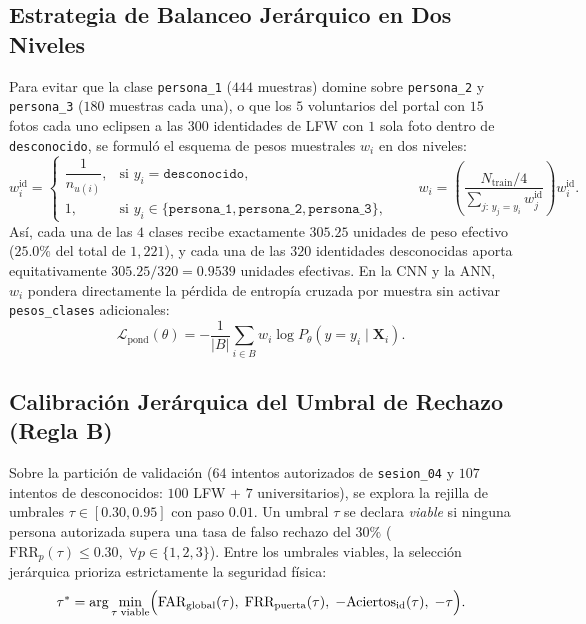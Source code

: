 \documentclass{article}
\begin{document}
\subsection{Estrategia de Balanceo Jerárquico en Dos Niveles}
Para evitar que la clase \texttt{persona\_1} ($444$ muestras) domine sobre \texttt{persona\_2} y \texttt{persona\_3} ($180$ muestras cada una), o que los $5$ voluntarios del portal con $15$ fotos cada uno eclipsen a las $300$ identidades de LFW con $1$ sola foto dentro de \texttt{desconocido}, se formuló el esquema de pesos muestrales $w_i$ en dos niveles:
\begin{equation}
w_i^{\text{id}} = \begin{cases}
\dfrac{1}{n_{u(i)}}, & \text{si } y_i = \texttt{desconocido}, \\
1, & \text{si } y_i \in \{\texttt{persona\_1}, \texttt{persona\_2}, \texttt{persona\_3}\},
\end{cases}
\qquad
w_i = \left(\frac{N_{\text{train}} / 4}{\sum_{j:\, y_j = y_i} w_j^{\text{id}}}\right) w_i^{\text{id}}.
\label{eq:balance_dos_niveles}
\end{equation}
Así, cada una de las $4$ clases recibe exactamente $305.25$ unidades de peso efectivo ($25.0\%$ del total de $1,221$), y cada una de las $320$ identidades desconocidas aporta equitativamente $305.25 / 320 = 0.9539$ unidades efectivas. En la CNN y la ANN, $w_i$ pondera directamente la pérdida de entropía cruzada por muestra sin activar \texttt{pesos\_clases} adicionales:
\begin{equation}
\mathcal{L}_{\text{pond}}(\theta) = -\frac{1}{|B|} \sum_{i \in B} w_i \log P_\theta(y = y_i \mid \mathbf{X}_i).
\label{eq:perdida_ponderada}
\end{equation}

\subsection{Calibración Jerárquica del Umbral de Rechazo (Regla B)}
Sobre la partición de validación ($64$ intentos autorizados de \texttt{sesion\_04} y $107$ intentos de desconocidos: $100$ LFW + $7$ universitarios), se explora la rejilla de umbrales $\tau \in [0.30, 0.95]$ con paso $0.01$. Un umbral $\tau$ se declara \textit{viable} si ninguna persona autorizada supera una tasa de falso rechazo del $30\%$ ($\text{FRR}_p(\tau) \le 0.30,\; \forall p \in \{1,2,3\}$). Entre los umbrales viables, la selección jerárquica prioriza estrictamente la seguridad física:
\begin{equation}
\tau^* = \arg\min_{\tau \;\text{viable}} \Bigl(\text{FAR}_{\text{global}}(\tau),\; \text{FRR}_{\text{puerta}}(\tau),\; -\text{Aciertos}_{\text{id}}(\tau),\; -\tau\Bigr).
\label{eq:seleccion_jerarquica}
\end{equation}
\end{document}
